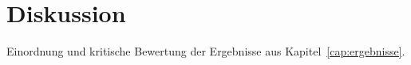 \section{Diskussion}
\label{cap:diskussion}

Einordnung und kritische Bewertung der Ergebnisse aus Kapitel~\ref{cap:ergebnisse}.
